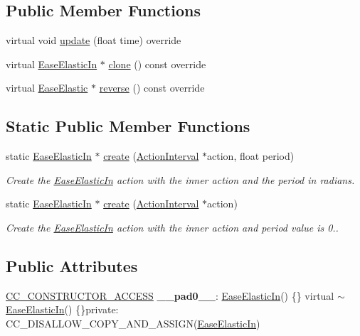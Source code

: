 \subsection*{Public Member Functions}
\begin{DoxyCompactItemize}
\item 
virtual void \hyperlink{classEaseElasticIn_acd62b61c4f4013bd98dcd991fbe9e276}{update} (float time) override
\item 
virtual \hyperlink{classEaseElasticIn}{Ease\+Elastic\+In} $\ast$ \hyperlink{classEaseElasticIn_af0095a2934fe5ba057205638349c132f}{clone} () const override
\item 
virtual \hyperlink{classEaseElastic}{Ease\+Elastic} $\ast$ \hyperlink{classEaseElasticIn_ae29b6a632f6721e3b43786df80b86cc1}{reverse} () const override
\end{DoxyCompactItemize}
\subsection*{Static Public Member Functions}
\begin{DoxyCompactItemize}
\item 
static \hyperlink{classEaseElasticIn}{Ease\+Elastic\+In} $\ast$ \hyperlink{classEaseElasticIn_a1c7f329121d30b9ade15e919ed180fb2}{create} (\hyperlink{classActionInterval}{Action\+Interval} $\ast$action, float period)
\begin{DoxyCompactList}\small\item\em Create the \hyperlink{classEaseElasticIn}{Ease\+Elastic\+In} action with the inner action and the period in radians. \end{DoxyCompactList}\item 
static \hyperlink{classEaseElasticIn}{Ease\+Elastic\+In} $\ast$ \hyperlink{classEaseElasticIn_ab1d314a00b5b44e4c150988048662367}{create} (\hyperlink{classActionInterval}{Action\+Interval} $\ast$action)
\begin{DoxyCompactList}\small\item\em Create the \hyperlink{classEaseElasticIn}{Ease\+Elastic\+In} action with the inner action and period value is 0.. \end{DoxyCompactList}\end{DoxyCompactItemize}
\subsection*{Public Attributes}
\begin{DoxyCompactItemize}
\item 
\mbox{\label{classEaseElasticIn_a809af6b46c78508efcf15f9121a93b4d}} 
\hyperlink{_2cocos2d_2cocos_2base_2ccConfig_8h_a25ef1314f97c35a2ed3d029b0ead6da0}{C\+C\+\_\+\+C\+O\+N\+S\+T\+R\+U\+C\+T\+O\+R\+\_\+\+A\+C\+C\+E\+SS} {\bfseries \+\_\+\+\_\+pad0\+\_\+\+\_\+}\+: \hyperlink{classEaseElasticIn}{Ease\+Elastic\+In}() \{\} virtual $\sim$\hyperlink{classEaseElasticIn}{Ease\+Elastic\+In}() \{\}private\+: C\+C\+\_\+\+D\+I\+S\+A\+L\+L\+O\+W\+\_\+\+C\+O\+P\+Y\+\_\+\+A\+N\+D\+\_\+\+A\+S\+S\+I\+GN(\hyperlink{classEaseElasticIn}{Ease\+Elastic\+In})
\end{DoxyCompactItemize}
